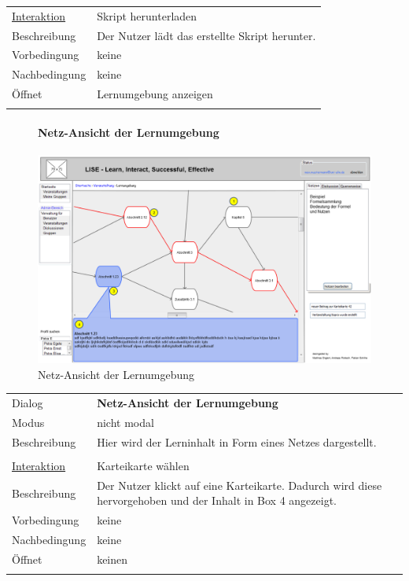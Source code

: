 \documentclass[12pt,a4paper]{article}
\begin{document}
{\begin{tabular}{l p{12cm}}
	\underline{Interaktion} 	 & Skript herunterladen\\ 
	Beschreibung   	& Der Nutzer lädt das erstellte Skript herunter.\\
	Vorbedingung	& keine \\
	Nachbedingung	& keine \\
	Öffnet			& Lernumgebung anzeigen\\\\
\end{tabular}

\begin{figure}[H]
	\centering
	\paragraph{Netz-Ansicht der Lernumgebung}
	\includegraphics[width=\textwidth]{Bilder/Mockups/GUI/NetzAnsichtKarteikarten.png}
	\caption{Netz-Ansicht der Lernumgebung}
	\label{GuiNetzAnsichtKarteikarten}
\end{figure}
\begin{tabular}{l p{12cm}}
	Dialog 	 & \textbf{Netz-Ansicht der Lernumgebung} \\ 
	Modus & nicht modal\\ 
	Beschreibung   	& Hier wird der Lerninhalt in Form eines Netzes dargestellt. \\\\
	
	\underline{Interaktion} 	 & Karteikarte wählen\\ 
	Beschreibung   	& Der Nutzer klickt auf eine Karteikarte. Dadurch wird diese hervorgehoben und der Inhalt in Box 4 angezeigt.\\
	Vorbedingung	& keine \\
	Nachbedingung	& keine \\
	Öffnet			& keinen\\\\
\end{tabular}

}
\end{document}
